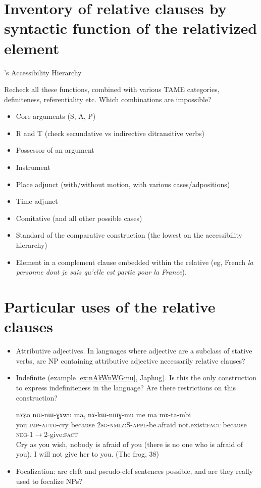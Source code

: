 \documentclass[oldfontcommands,oneside,a4paper,11pt]{article}
\newcommand{\ipa}[1]{{\phon #1}} %
\begin{document}
 \section{Inventory of relative clauses by syntactic function of the relativized element} \label{sec:inventory}
\citet{keenan77accessibility}'s Accessibility Hierarchy

Recheck all these functions, combined with various TAME categories, definiteness, referentiality etc. Which combinations are impossible?

\begin{itemize}
\item Core arguments (S, A, P)
\item R and T (check secundative vs indirective ditransitive verbs)
\item Possessor of an argument
\item Instrument
\item Place adjunct (with/without motion, with various cases/adpositions)
\item Time adjunct
\item Comitative (and all other possible cases)
\item Standard of the comparative construction (the lowest on the accessibility hierarchy)
\item Element in a complement clause embedded within the relative (eg, French \textit{la personne dont je sais qu'elle est partie pour la France}).

\end{itemize}


\section{Particular uses of the relative clauses}
\begin{itemize}
\item Attributive adjectives. In languages where adjective are a subclass of stative verbs, are NP containing attributive adjective necessarily relative clauses?
\item Indefinite (example \ref{ex:nAkWnWGmu}, Japhug). Is this the only construction to express indefiniteness in the language? Are there restrictions on this construction?

\begin{exe}
   \ex  \label{ex:nAkWnWGmu}
\gll   
\ipa{nɤʑo}  	\ipa{nɯ-nɯ-ɣɤwu}  	\ipa{ma,}  	\ipa{nɤ-kɯ-nɯɣ-mu}  	\ipa{me}  	\ipa{ma}  	\ipa{mɤ-ta-mbi}  \\
you \textsc{imp-auto}-cry because \textsc{2sg-nmlz:S-appl}-be.afraid not.exist:\textsc{fact} because \textsc{neg-1$\rightarrow$2-}give:\textsc{fact} \\
\glt Cry as you wish, nobody is afraid of you (there is no one who is afraid of you), I will not give her to you.  (The frog, 38)
\end{exe}
\item Focalization: are cleft and  pseudo-clef sentences possible, and are they really used to focalize NPs?
\end{itemize}
\end{document}

